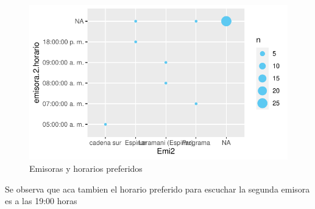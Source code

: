 \documentclass[12pt]{article}\usepackage[]{graphicx}\usepackage[]{xcolor}
\makeatletter
\def\maxwidth{ %
  \ifdim\Gin@nat@width>\linewidth
    \linewidth
  \else
    \Gin@nat@width
  \fi
}
\newenvironment{knitrout}{}{} %
\makeatother
\begin{document}
	\begin{figure}[H]
	\centering
\begin{knitrout}
\color{fgcolor}
\includegraphics[width=\maxwidth]{figure/six-1} 
\end{knitrout}
	\caption{Emisoras y horarios preferidos}
	\end{figure}
	Se observa que aca tambien el horario preferido para escuchar la segunda emisora es a las 19:00 horas
	
	
\end{document}
